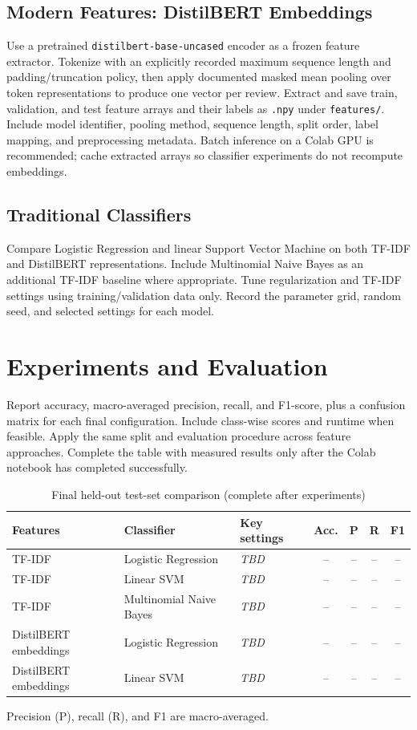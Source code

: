 \subsection{Modern Features: DistilBERT Embeddings}
Use a pretrained \texttt{distilbert-base-uncased} encoder as a frozen feature extractor. Tokenize with an explicitly recorded maximum sequence length and padding/truncation policy, then apply documented masked mean pooling over token representations to produce one vector per review. Extract and save train, validation, and test feature arrays and their labels as \texttt{.npy} under \texttt{features/}. Include model identifier, pooling method, sequence length, split order, label mapping, and preprocessing metadata. Batch inference on a Colab GPU is recommended; cache extracted arrays so classifier experiments do not recompute embeddings.

\subsection{Traditional Classifiers}
Compare Logistic Regression and linear Support Vector Machine on both TF-IDF and DistilBERT representations. Include Multinomial Naive Bayes as an additional TF-IDF baseline where appropriate. Tune regularization and TF-IDF settings using training/validation data only. Record the parameter grid, random seed, and selected settings for each model.

\section{Experiments and Evaluation}
Report accuracy, macro-averaged precision, recall, and F1-score, plus a confusion matrix for each final configuration. Include class-wise scores and runtime when feasible. Apply the same split and evaluation procedure across feature approaches. Complete the table with measured results only after the Colab notebook has completed successfully.

\begin{table}[H]
\centering
\footnotesize
\begin{tabularx}{\textwidth}{p{2cm} p{2.6cm} X c c c c}
\toprule
Features & Classifier & Key settings & Acc. & P & R & F1 \\
\midrule
TF-IDF & Logistic Regression & \textit{TBD} & -- & -- & -- & -- \\
TF-IDF & Linear SVM & \textit{TBD} & -- & -- & -- & -- \\
TF-IDF & Multinomial Naive Bayes & \textit{TBD} & -- & -- & -- & -- \\
DistilBERT embeddings & Logistic Regression & \textit{TBD} & -- & -- & -- & -- \\
DistilBERT embeddings & Linear SVM & \textit{TBD} & -- & -- & -- & -- \\
\bottomrule
\end{tabularx}
\caption{Final held-out test-set comparison (complete after experiments)}
\end{table}
Precision (P), recall (R), and F1 are macro-averaged.

